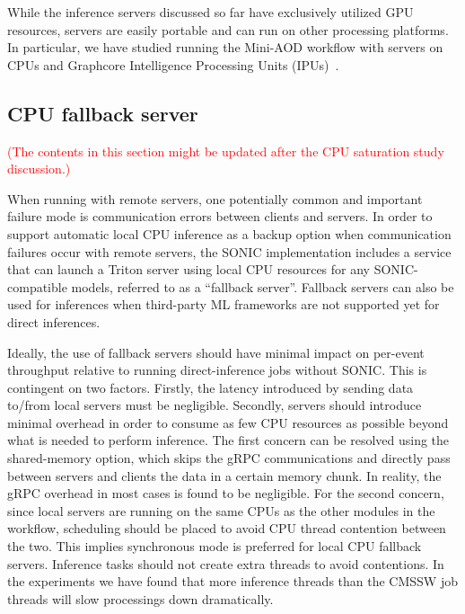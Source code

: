 While the inference servers discussed so far have exclusively utilized GPU resources, servers are easily portable and can run on other processing platforms. In particular, we have studied running the Mini-AOD workflow with servers on CPUs and Graphcore Intelligence Processing Units (IPUs)~\cite{Graphcore}.

\subsection{CPU fallback server}
\label{sec:fallback}
\textcolor{red}{(The contents in this section might be updated after the CPU saturation study discussion.)}

When running with remote servers, one potentially common and important failure mode is communication errors between clients and servers. In order to support automatic local CPU inference as a backup option when communication failures occur with remote servers, the SONIC implementation includes a service that can launch a Triton server using local CPU resources for any SONIC-compatible models, referred to as a ``fallback server''. Fallback servers can also be used for inferences when third-party ML frameworks are not supported yet for direct inferences. 

Ideally, the use of fallback servers should have minimal impact on per-event throughput relative to running direct-inference jobs without SONIC. This is contingent on two factors. Firstly, the latency introduced by sending data to/from local servers must be negligible. Secondly, servers should introduce minimal overhead in order to consume as few CPU resources as possible beyond what is needed to perform inference. The first concern can be resolved using the shared-memory option, which skips the gRPC communications and directly pass between servers and clients the data in a certain memory chunk. In reality, the gRPC overhead in most cases is found to be negligible. For the second concern, since local servers are running on the same CPUs as the other modules in the workflow, scheduling should be placed to avoid CPU thread contention between the two. This implies synchronous mode is preferred for local CPU fallback servers. Inference tasks should not create extra threads to avoid contentions. In the experiments we have found that more inference threads than the CMSSW job threads will slow processings down dramatically.

